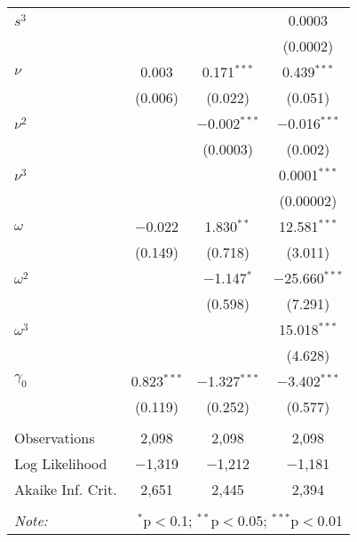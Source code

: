 \begin{table}[!htbp]
\begin{tabular}{@{\extracolsep{5pt}}lccc}
 $s^3$ &  &  & 0.0003 \\ 
  &  &  & (0.0002) \\ 

 $\nu$ & 0.003 & 0.171$^{***}$ & 0.439$^{***}$ \\ 
  & (0.006) & (0.022) & (0.051) \\ 

 $\nu^2$ &  & $-$0.002$^{***}$ & $-$0.016$^{***}$ \\ 
  &  & (0.0003) & (0.002) \\ 

 $\nu^3$ &  &  & 0.0001$^{***}$ \\ 
  &  &  & (0.00002) \\ 

 $\omega$ & $-$0.022 & 1.830$^{**}$ & 12.581$^{***}$ \\ 
  & (0.149) & (0.718) & (3.011) \\ 

 $\omega^2$ &  & $-$1.147$^{*}$ & $-$25.660$^{***}$ \\ 
  &  & (0.598) & (7.291) \\ 

 $\omega^3$ &  &  & 15.018$^{***}$ \\ 
  &  &  & (4.628) \\ 

 $\gamma_0$ & 0.823$^{***}$ & $-$1.327$^{***}$ & $-$3.402$^{***}$ \\ 
  & (0.119) & (0.252) & (0.577) \\ 

\hline \\[-1.8ex] 
Observations & 2,098 & 2,098 & 2,098 \\ 
Log Likelihood & $-$1,319 & $-$1,212 & $-$1,181 \\ 
Akaike Inf. Crit. & 2,651 & 2,445 & 2,394 \\ 
\hline 
\hline \\[-1.8ex] 
\textit{Note:}  & \multicolumn{3}{r}{$^{*}$p$<$0.1; $^{**}$p$<$0.05; $^{***}$p$<$0.01} \\ 
\end{tabular} 
\end{table}  
